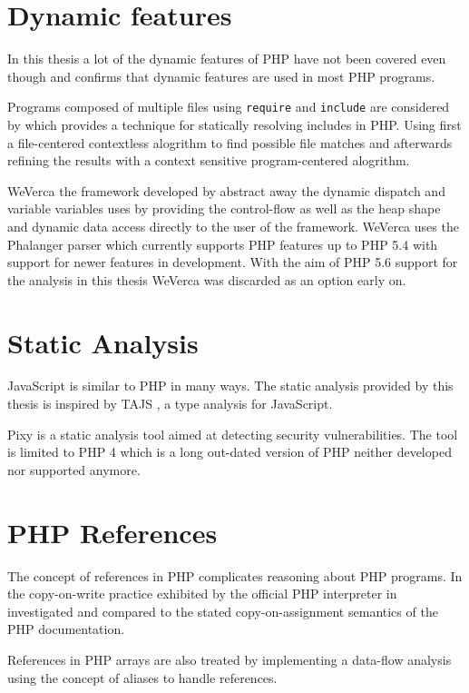 \section{Dynamic features}
In this thesis a lot of the dynamic features of PHP have not been covered even though  and  confirms that dynamic features are used in most PHP programs.

Programs composed of multiple files using \texttt{require} and \texttt{include} are considered by  which provides a technique for statically resolving includes in PHP. Using first a file-centered contextless alogrithm to find possible file matches and afterwards refining the results with a context sensitive program-centered alogrithm.

WeVerca the framework developed by  abstract away the dynamic dispatch and variable variables uses by providing the control-flow as well as the heap shape and dynamic data access directly to the user of the framework. WeVerca uses the Phalanger parser which currently supports PHP features up to PHP 5.4 with support for newer features in development. With the aim of PHP 5.6 support for the analysis in this thesis WeVerca was discarded as an option early on.

\section{Static Analysis}
JavaScript is similar to PHP in many ways. The static analysis provided by this thesis is inspired by TAJS , a type analysis for JavaScript. 

Pixy  is a static analysis tool aimed at detecting security vulnerabilities. The tool is limited to PHP 4 which is a long out-dated version of PHP neither developed nor supported anymore.

\section{PHP References}
The concept of references in PHP complicates reasoning about PHP programs. In  the copy-on-write practice exhibited by the official PHP interpreter in investigated and compared to the stated copy-on-assignment semantics of the PHP documentation.

References in PHP arrays are also treated by  implementing a data-flow analysis using the concept of aliases to handle references.

